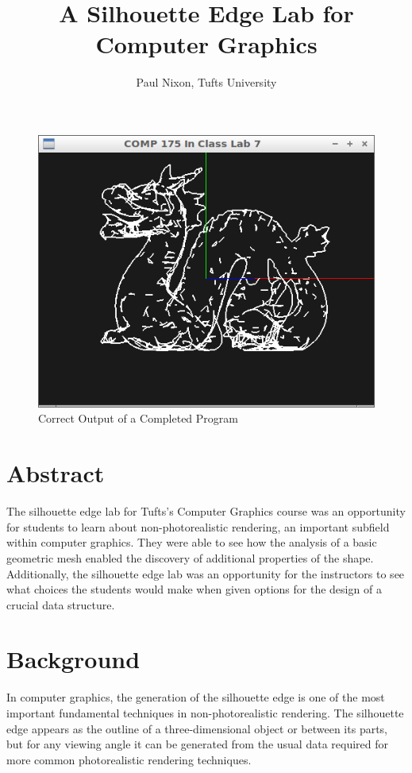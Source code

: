 \documentclass[10pt,twocolumn]{article}
\title{\Large{\bf A Silhouette Edge Lab for Computer Graphics}}
\author{Paul Nixon, Tufts University}
\date{}
\begin{document}
\maketitle
\begin{figure}
\centerline{\includegraphics[width=5in]{scrot}}
\caption{Correct Output of a Completed Program}
\end{figure}

\section{Abstract}
The silhouette edge lab for Tufts's Computer Graphics course was an opportunity for students to learn about non-photorealistic rendering, an important subfield within computer graphics.  They were able to see how the analysis of a basic geometric mesh enabled the discovery of additional properties of the shape.  Additionally, the silhouette edge lab was an opportunity for the instructors to see what choices the students would make when given options for the design of a crucial data structure.  

\section{Background}
In computer graphics, the generation of the silhouette edge is one of the most important fundamental techniques in non-photorealistic rendering.  The silhouette edge appears as the outline of a three-dimensional object or between its parts, but for any viewing angle it can be generated from the usual data required for more common photorealistic rendering techniques.  
\end{document}

